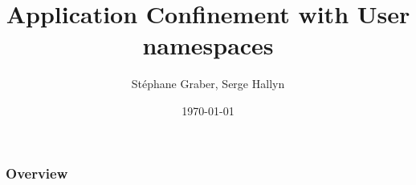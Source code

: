 \documentclass{beamer}
\title[User Namespaces]{Application Confinement with User namespaces} %
\author{Stéphane Graber, Serge Hallyn} %
\institute[Canonical] %
{
Canonical, Inc \\ %
\medskip
\textit{stgraber@ubuntu.com, serge.hallyn@ubuntu.com} %
}
\date{\today} %
\begin{document}
\begin{frame}
\titlepage %
\end{frame}

\begin{frame}
\frametitle{Overview} %
\tableofcontents %
\end{frame}


\end{document}
